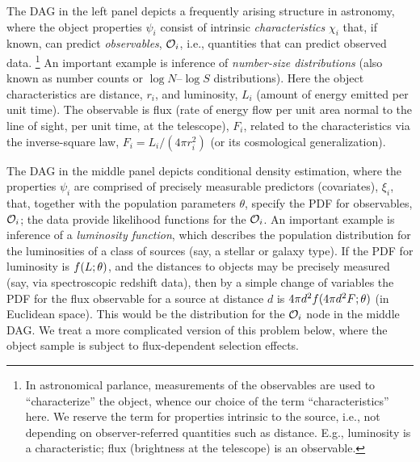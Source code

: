 The DAG in the left panel depicts a frequently arising structure in astronomy, where the object properties $\psi_i$ consist of intrinsic \emph{characteristics} $\chi_i$ that, if known, can predict \emph{observables}, $\mathcal{O}_i$, i.e., quantities that can predict observed data.%
\footnote{In astronomical parlance, measurements of the observables are used to ``characterize'' the object, whence our choice of the term ``characteristics'' here.
We reserve the term for properties intrinsic to the source, i.e., not depending on observer-referred quantities such as distance.
E.g., luminosity is a characteristic; flux (brightness at the telescope) is an observable.}
An important example is inference of \emph{number-size distributions} (also known as number counts or $\log N$--$\log S$ distributions).
Here the object characteristics are distance, $r_i$, and luminosity, $L_i$ (amount of energy emitted per unit time).
The observable is flux (rate of energy flow per unit area normal to the line of sight, per unit time, at the telescope), $F_i$, related to the characteristics via the inverse-square law, $F_i = L_i/(4\pi r_i^2)$ (or its cosmological generalization).

The DAG in the middle panel depicts conditional density estimation, where the properties $\psi_i$ are comprised of precisely measurable predictors (covariates), $\xi_i$, that, together with the population parameters $\theta$, specify the PDF for observables, $\mathcal{O}_i$; the data provide likelihood functions for the $\mathcal{O}_i$.
An important example is inference of a \emph{luminosity function}, which describes the population distribution for the luminosities of a class of sources (say, a stellar or galaxy type).
If the PDF for luminosity is $f(L;\theta)$, and the distances to objects may be precisely measured (say, via spectroscopic redshift data), then by a simple change of variables the PDF for the flux observable for a source at distance $d$ is $4\pi d^2 f(4\pi d^2 F; \theta)$ (in Euclidean space).
This would be the distribution for the $\mathcal{O}_i$ node in the middle DAG.
We treat a more complicated version of this problem below, where the object sample is subject to flux-dependent selection effects.

